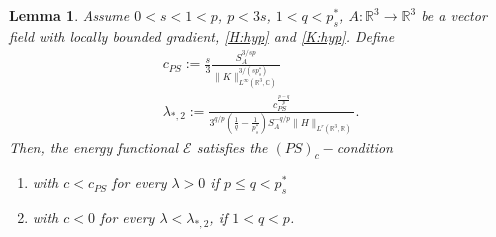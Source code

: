 \documentclass[leqno,11pt]{amsart}
\newcommand{\R}{\mathbb R}
\newcommand{\CC}{\mathbb C}
\newcommand{\cE}{{\mathcal E}}
\numberwithin{equation}{section}
\newtheorem{lemma}[theorem]{Lemma}
\begin{document}
\begin{lemma}\label{lem5}
Assume $0<s<1<p$, $p<3s$, $1<q < p^*_s$, $A:\R^3 \to \R^3$ be a vector field with locally bounded gradient, \eqref{H:hyp} and \eqref{K:hyp}.
Define 
\begin{gather}
c_{PS}:=\frac{s}{3}\frac{S_A^{3/sp}}{\|K\|_{L^\infty(\R^3, \CC)}^{3/(sp^*_s)}} \label{csegnato}\\
\lambda_{*,2}:=\frac{c_{PS}^{\frac{p-q}{p}}}{3^{q/p}\left(\frac{1}{q}-\frac{1}{p^*_s}\right)S_A^{-q/p}\|H\|_{L^r(\R^3,\R)}}\label{lambdacomp}.
\end{gather}
Then, the energy functional $\cE$ satisfies the $(PS)_c-$condition 
\begin{enumerate}[label=\arabic*)]
    \item with $c<c_{PS}$ for every $\lambda>0$ if $p\le q<p^*_s$
    \item with $c<0$ for every $\lambda<\lambda_{*,2}$, if $1 < q < p$.
\end{enumerate}
\end{lemma}
\end{document}
